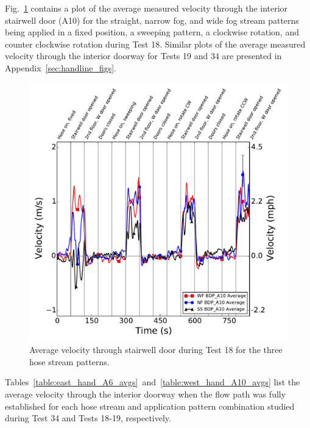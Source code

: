 \documentclass[12pt,oneside]{book}
\begin{document}
Fig.~\ref{fig:Test_18_BDP_A10_Avg_All} contains a plot of the average measured velocity through the interior stairwell door (A10) for the straight, narrow fog, and wide fog stream patterns being applied in a fixed position, a sweeping pattern, a clockwise rotation, and counter clockwise rotation during Test 18. Similar plots of the average measured velocity through the interior doorway for Tests 19 and 34 are presented in Appendix~\ref{sec:handline_figs}.

\begin{figure}[!ht]
	\includegraphics[width=\columnwidth]{../Figures/Plots/Test_18_West_063014_BDP_A10_stream_avgs}
	\caption{Average velocity through stairwell door during Test 18 for the three hose stream patterns.}
	\label{fig:Test_18_BDP_A10_Avg_All}
\end{figure}
\FloatBarrier

Tables~\ref{table:east_hand_A6_avgs}~and~\ref{table:west_hand_A10_avgs} list the average velocity through the interior doorway when the flow path was fully established for each hose stream and application pattern combination studied during Test 34 and Tests 18-19, respectively.

\end{document}
